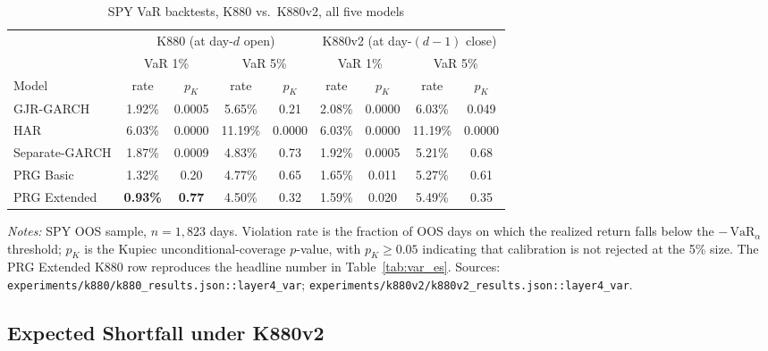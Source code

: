 \documentclass[11pt,a4paper]{article}
\begin{document}
\begin{table}[htbp]
\centering
\caption{SPY VaR backtests, K880 vs.\ K880v2, all five models}
\label{app:tab:var_5models}
\small
\begin{tabular}{l cc cc cc cc}
\toprule
 & \multicolumn{4}{c}{K880 (at day-$d$ open)}
 & \multicolumn{4}{c}{K880v2 (at day-$(d{-}1)$ close)} \\
\cmidrule(lr){2-5} \cmidrule(lr){6-9}
 & \multicolumn{2}{c}{VaR 1\%} & \multicolumn{2}{c}{VaR 5\%}
 & \multicolumn{2}{c}{VaR 1\%} & \multicolumn{2}{c}{VaR 5\%} \\
\cmidrule(lr){2-3} \cmidrule(lr){4-5} \cmidrule(lr){6-7} \cmidrule(lr){8-9}
Model & rate & $p_K$ & rate & $p_K$ & rate & $p_K$ & rate & $p_K$ \\
\midrule
GJR-GARCH      & 1.92\% & 0.0005 & 5.65\% & 0.21   & 2.08\% & 0.0000 & 6.03\% & 0.049 \\
HAR            & 6.03\% & 0.0000 & 11.19\% & 0.0000 & 6.03\% & 0.0000 & 11.19\% & 0.0000 \\
Separate-GARCH & 1.87\% & 0.0009 & 4.83\% & 0.73   & 1.92\% & 0.0005 & 5.21\% & 0.68 \\
PRG Basic      & 1.32\% & 0.20   & 4.77\% & 0.65   & 1.65\% & 0.011  & 5.27\% & 0.61 \\
PRG Extended   & \textbf{0.93\%} & \textbf{0.77} & 4.50\% & 0.32 & 1.59\% & 0.020 & 5.49\% & 0.35 \\
\bottomrule
\end{tabular}
\begin{flushleft}
\footnotesize
\emph{Notes:} SPY OOS sample, $n = 1{,}823$ days. Violation rate is the
fraction of OOS days on which the realized return falls below the
$-\,\text{VaR}_\alpha$ threshold; $p_K$ is the Kupiec unconditional-coverage
$p$-value, with $p_K \geq 0.05$ indicating that calibration is not
rejected at the 5\% size. The PRG Extended K880 row reproduces the
headline number in Table~\ref{tab:var_es}.
Sources: \texttt{experiments/k880/k880\_results.json::layer4\_var};
\texttt{experiments/k880v2/k880v2\_results.json::layer4\_var}.
\end{flushleft}
\end{table}

\subsection*{Expected Shortfall under K880v2}
\end{document}
